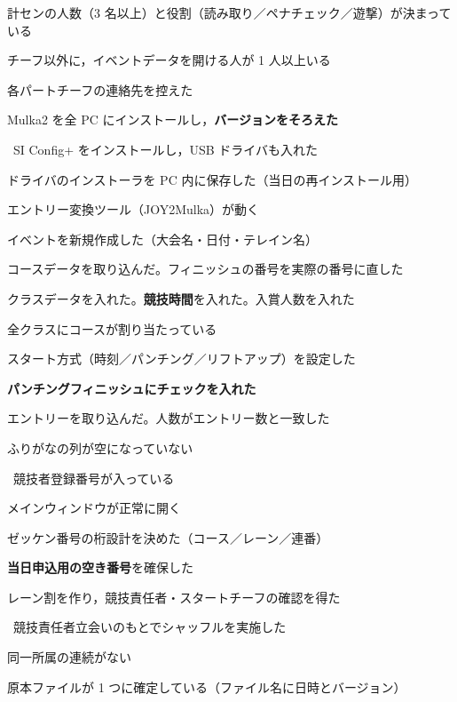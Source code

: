 \begin{cklist}
\item 計センの人数（3 名以上）と役割（読み取り／ペナチェック／遊撃）が決まっている
\item チーフ以外に，イベントデータを開ける人が 1 人以上いる
\item 各パートチーフの連絡先を控えた
\end{cklist}

\begin{cklist}
\item Mulka2 を全 PC にインストールし，\textbf{バージョンをそろえた}
\item \tSI\ SI Config+ をインストールし，USB ドライバも入れた
\item ドライバのインストーラを PC 内に保存した（当日の再インストール用）
\item エントリー変換ツール（JOY2Mulka）が動く
\end{cklist}

\begin{cklist}
\item イベントを新規作成した（大会名・日付・テレイン名）
\item コースデータを取り込んだ。フィニッシュの番号を実際の番号に直した
\item クラスデータを入れた。\textbf{競技時間}を入れた。入賞人数を入れた
\item 全クラスにコースが割り当たっている
\item スタート方式（時刻／パンチング／リフトアップ）を設定した
\item \textbf{パンチングフィニッシュにチェックを入れた}
\item エントリーを取り込んだ。人数がエントリー数と一致した
\item ふりがなの列が空になっていない
\item \tRANK\ 競技者登録番号が入っている
\item メインウィンドウが正常に開く
\end{cklist}

\begin{cklist}
\item ゼッケン番号の桁設計を決めた（コース／レーン／連番）
\item \textbf{当日申込用の空き番号}を確保した
\item レーン割を作り，競技責任者・スタートチーフの確認を得た
\item \tRANK\ 競技責任者立会いのもとでシャッフルを実施した
\item 同一所属の連続がない
\item 原本ファイルが 1 つに確定している（ファイル名に日時とバージョン）
\end{cklist}

